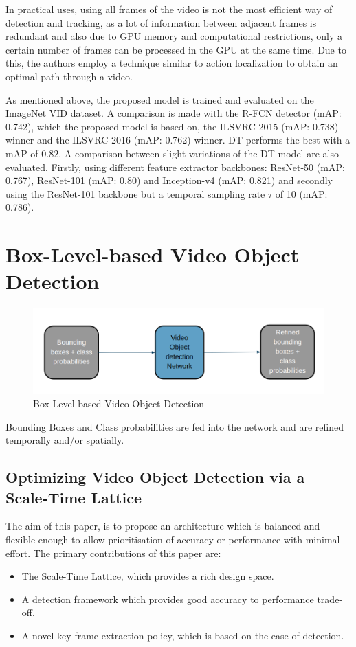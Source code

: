 \documentclass[conference]{IEEEtran}
\begin{document}
In practical uses, using all frames of the video is not the most efficient way of detection and tracking, as a lot of information between adjacent frames is redundant and also due to GPU memory and computational restrictions, only a certain number of frames can be processed in the GPU at the same time. Due to this, the authors employ a technique similar to action localization\cite{b41} to obtain an optimal path through a video. \newline

As mentioned above, the proposed model is trained and evaluated on the ImageNet VID dataset. A comparison is made with the R-FCN detector (mAP: 0.742), which the proposed model is based on, the ILSVRC 2015\cite{b42} (mAP: 0.738) winner and the ILSVRC 2016\cite{b43} (mAP: 0.762) winner. DT performs the best with a mAP of 0.82. A comparison between slight variations of the DT model are also evaluated. Firstly, using different feature extractor backbones: ResNet-50 (mAP: 0.767), ResNet-101 (mAP: 0.80) and Inception-v4 (mAP: 0.821)\cite{b44} and secondly using the ResNet-101 backbone but a temporal sampling rate $\tau$ of 10 (mAP: 0.786).

\section{Box-Level-based Video Object Detection}

\begin{figure}[h]
\includegraphics[width=\columnwidth]{box-level-basic}
\caption{Box-Level-based Video Object Detection}
\end{figure}
Bounding Boxes and Class probabilities are fed into the network and are refined temporally and/or spatially.

\subsection{Optimizing Video Object Detection via a Scale-Time Lattice\cite{b10}}

The aim of this paper, is to propose an architecture which is balanced and flexible enough to allow prioritisation of accuracy or performance with minimal effort. The primary contributions of this paper are:
\begin{itemize}
	\item The Scale-Time Lattice, which provides a rich design space.
	\item A detection framework which provides good accuracy to performance trade-off.
	\item A novel key-frame extraction policy, which is based on the ease of detection.
\end{itemize}
\end{document}
